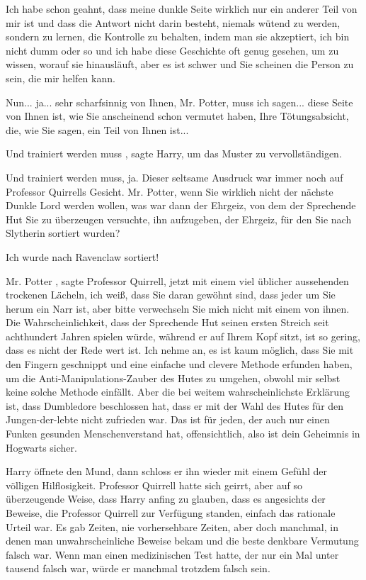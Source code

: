 \glqq Ich habe schon geahnt, dass meine dunkle Seite wirklich nur ein anderer
Teil von mir ist und dass die Antwort nicht darin besteht, niemals wütend zu
werden, sondern zu lernen, die Kontrolle zu behalten, indem man sie akzeptiert,
ich bin nicht dumm oder so und ich habe diese Geschichte oft genug gesehen, um
zu wissen, worauf sie hinausläuft, aber es ist schwer und Sie scheinen die
Person zu sein, die mir helfen kann.\grqq{}

\glqq Nun... ja... sehr scharfsinnig von Ihnen, Mr. Potter, muss ich sagen...
diese Seite von Ihnen ist, wie Sie anscheinend schon vermutet haben, Ihre
Tötungsabsicht, die, wie Sie sagen, ein Teil von Ihnen ist...\grqq{}

\glqq Und trainiert werden muss\grqq{} , sagte Harry, um das Muster zu
vervollständigen.

\glqq Und trainiert werden muss, ja.\grqq{} Dieser seltsame Ausdruck war immer
noch auf Professor Quirrells Gesicht. \glqq Mr. Potter, wenn Sie wirklich nicht
der nächste Dunkle Lord werden wollen, was war dann der Ehrgeiz, von dem der
Sprechende Hut Sie zu überzeugen versuchte, ihn aufzugeben, der Ehrgeiz, für den
Sie nach Slytherin sortiert wurden?\grqq{}

\glqq Ich wurde nach Ravenclaw sortiert!\grqq{}

\glqq Mr. Potter\grqq{} , sagte Professor Quirrell, jetzt mit einem viel
üblicher aussehenden trockenen Lächeln, \glqq ich weiß, dass Sie daran gewöhnt
sind, dass jeder um Sie herum ein Narr ist, aber bitte verwechseln Sie mich
nicht mit einem von ihnen. Die Wahrscheinlichkeit, dass der Sprechende Hut
seinen ersten Streich seit achthundert Jahren spielen würde, während er auf
Ihrem Kopf sitzt, ist so gering, dass es nicht der Rede wert ist. Ich nehme an,
es ist kaum möglich, dass Sie mit den Fingern geschnippt und eine einfache und
clevere Methode erfunden haben, um die Anti-Manipulations-Zauber des Hutes zu
umgehen, obwohl mir selbst keine solche Methode einfällt. Aber die bei weitem
wahrscheinlichste Erklärung ist, dass Dumbledore beschlossen hat, dass er mit
der Wahl des Hutes für den Jungen-der-lebte nicht zufrieden war. Das ist für
jeden, der auch nur einen Funken gesunden Menschenverstand hat, offensichtlich,
also ist dein Geheimnis in Hogwarts sicher.\grqq{}

Harry öffnete den Mund, dann schloss er ihn wieder mit einem Gefühl der völligen
Hilflosigkeit. Professor Quirrell hatte sich geirrt, aber auf so überzeugende
Weise, dass Harry anfing zu glauben, dass es angesichts der Beweise, die
Professor Quirrell zur Verfügung standen, einfach das rationale Urteil war. Es
gab Zeiten, nie vorhersehbare Zeiten, aber doch manchmal, in denen man
unwahrscheinliche Beweise bekam und die beste denkbare Vermutung falsch war.
Wenn man einen medizinischen Test hatte, der nur ein Mal unter tausend falsch
war, würde er manchmal trotzdem falsch sein.

